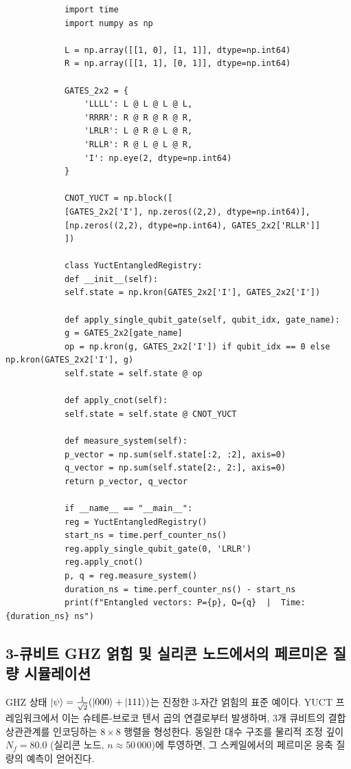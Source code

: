 \documentclass[11pt,a4paper]{article}
\begin{document}
	\begin{tcolorbox}[title=YUCT CNOT 얽힘 에뮬레이터 (Python), breakable]
		\begin{lstlisting}
			import time
			import numpy as np
			
			L = np.array([[1, 0], [1, 1]], dtype=np.int64)
			R = np.array([[1, 1], [0, 1]], dtype=np.int64)
			
			GATES_2x2 = {
				'LLLL': L @ L @ L @ L,
				'RRRR': R @ R @ R @ R,
				'LRLR': L @ R @ L @ R,
				'RLLR': R @ L @ L @ R,
				'I': np.eye(2, dtype=np.int64)
			}
			
			CNOT_YUCT = np.block([
			[GATES_2x2['I'], np.zeros((2,2), dtype=np.int64)],
			[np.zeros((2,2), dtype=np.int64), GATES_2x2['RLLR']]
			])
			
			class YuctEntangledRegistry:
			def __init__(self):
			self.state = np.kron(GATES_2x2['I'], GATES_2x2['I'])
			
			def apply_single_qubit_gate(self, qubit_idx, gate_name):
			g = GATES_2x2[gate_name]
			op = np.kron(g, GATES_2x2['I']) if qubit_idx == 0 else np.kron(GATES_2x2['I'], g)
			self.state = self.state @ op
			
			def apply_cnot(self):
			self.state = self.state @ CNOT_YUCT
			
			def measure_system(self):
			p_vector = np.sum(self.state[:2, :2], axis=0)
			q_vector = np.sum(self.state[2:, 2:], axis=0)
			return p_vector, q_vector
			
			if __name__ == "__main__":
			reg = YuctEntangledRegistry()
			start_ns = time.perf_counter_ns()
			reg.apply_single_qubit_gate(0, 'LRLR')
			reg.apply_cnot()
			p, q = reg.measure_system()
			duration_ns = time.perf_counter_ns() - start_ns
			print(f"Entangled vectors: P={p}, Q={q}  |  Time: {duration_ns} ns")
		\end{lstlisting}
	\end{tcolorbox}
	
	\subsection{3-큐비트 GHZ 얽힘 및 실리콘 노드에서의 페르미온 질량 시뮬레이션}
	
	GHZ 상태 \(\ket{\psi} = \frac{1}{\sqrt{2}}(\ket{000} + \ket{111})\)는 진정한 3-자간 얽힘의 표준 예이다. YUCT 프레임워크에서 이는 슈테른-브로코 텐서 곱의 연결로부터 발생하며, 3개 큐비트의 결합 상관관계를 인코딩하는 \(8\times 8\) 행렬을 형성한다. 동일한 대수 구조를 물리적 조정 깊이 \(N_f = 80.0\) (실리콘 노드, \(n \approx 50\,000\))에 투영하면, 그 스케일에서의 페르미온 응축 질량의 예측이 얻어진다.
	
\end{document}
